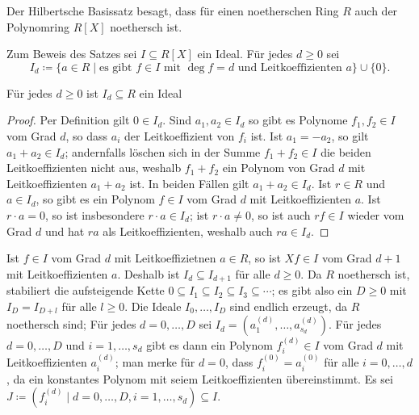 \begin{question}
  Der Hilbertsche Basissatz besagt, dass für einen noetherschen Ring $R$ auch der Polynomring $R[X]$ noethersch ist.
  
  Zum Beweis des Satzes sei $I \subseteq R[X]$ ein Ideal.
  Für jedes $d \geq 0$ sei
  \[
              I_d
    \coloneqq \{a \in R \mid \text{es gibt $f \in I$ mit $\deg f = d$ und Leitkoeffizienten $a$}\} \cup \{0\}.
  \]
  
  \begin{claim*}
    Für jedes $d \geq 0$ ist $I_d \subseteq R$ ein Ideal
  \end{claim*}
  \begin{proof}
    Per Definition gilt $0 \in I_d$.
    Sind $a_1, a_2 \in I_d$ so gibt es Polynome $f_1, f_2 \in I$ vom Grad $d$, so dass $a_i$ der Leitkoeffizient von $f_i$ ist.
    Ist $a_1 = -a_2$, so gilt $a_1 + a_2\in I_d$;
    andernfalls löschen sich in der Summe $f_1 + f_2 \in I$ die beiden Leitkoeffizienten nicht aus, weshalb $f_1 + f_2$ ein Polynom von Grad $d$ mit Leitkoeffizienten $a_1 + a_2$ ist.
    In beiden Fällen gilt $a_1 + a_2 \in I_d$.
    Ist $r \in R$ und $a \in I_d$, so gibt es ein Polynom $f \in I$ vom Grad $d$ mit Leitkoeffizienten $a$.
    Ist $r \cdot a = 0$, so ist insbesondere $r \cdot a \in I_d$;
    ist $r \cdot a \neq 0$, so ist auch $r f \in I$ wieder vom Grad $d$ und hat $ra$ als Leitkoeffizienten, weshalb auch $ra \in I_d$.
  \end{proof}
  
  Ist $f \in I$ vom Grad $d$ mit Leitkoeffizietnen $a \in R$, so ist $X f \in I$ vom Grad $d+1$ mit Leitkoeffizienten $a$.
  Deshalb ist $I_d \subseteq I_{d+1}$ für alle $d \geq 0$.
  Da $R$ noethersch ist, stabiliert die aufsteigende Kette $0 \subseteq I_1 \subseteq I_2 \subseteq I_3 \subseteq \dotsb$; es gibt also ein $D \geq 0$ mit $I_D = I_{D+l}$ für alle $l \geq 0$.
  Die Ideale $I_0, \dotsc, I_D$ sind endlich erzeugt, da $R$ noethersch sind;
  Für jedes $d = 0, \dotsc, D$ sei $I_d = (a^{(d)}_1, \dotsc, a^{(d)}_{s_d})$.
  Für jedes $d = 0, \dotsc, D$ und $i = 1, \dotsc, s_d$ gibt es dann ein Polynom $f^{(d)}_i \in I$ vom Grad $d$ mit Leitkoeffizienten $a^{(d)}_i$;
  man merke für $d = 0$, dass $f^{(0)}_i = a^{(0)}_i$ für alle $i = 0, \dotsc, d$, da ein konstantes Polynom mit seiem Leitkoeffizienten übereinstimmt.
  Es sei $J \coloneqq (f^{(d)}_i \mid d = 0, \dotsc, D, i = 1, \dotsc, s_d) \subseteq I$.
  

\end{question}
